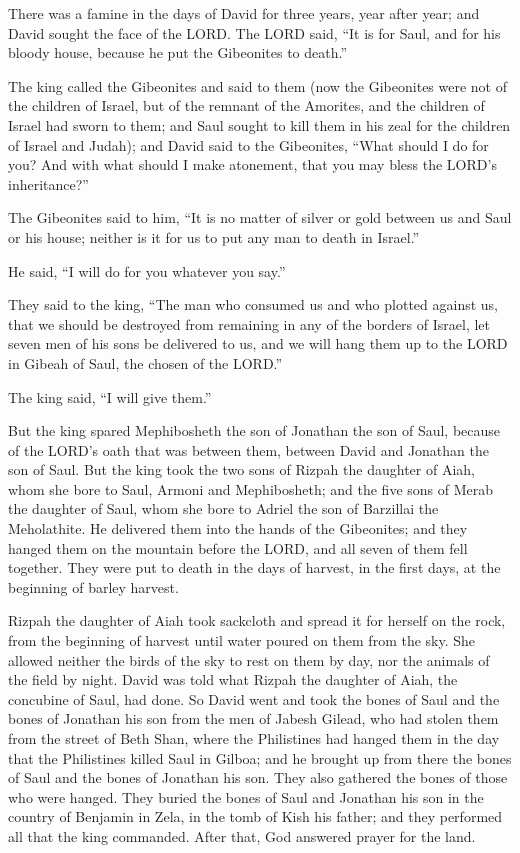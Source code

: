 \mychapter{} \myverse*{}There was a famine in the days of David for three years, year
after year; and David sought the face of the LORD. The LORD said, “It is for Saul, and for his bloody
house, because he put the Gibeonites to death.”

\myverse{}The king called the Gibeonites and said to them (now the Gibeonites
were not of the children of Israel, but of the remnant of the Amorites, and the children of Israel had
sworn to them; and Saul sought to kill them in his zeal for the children of Israel and Judah);
\myverse{}and David said to the Gibeonites, “What should I do for you? And with what
should I make atonement, that you may bless the LORD’s inheritance?”

\myverse{}The Gibeonites said to him, “It is no matter of silver or gold
between us and Saul or his house; neither is it for us to put any man to death in Israel.”

He said, “I will do for you whatever you say.”

\myverse{}They said to the king, “The man who consumed us and who plotted
against us, that we should be destroyed from remaining in any of the borders of Israel,
\myverse{}let seven men of his sons be delivered to us, and we will hang them up to the
LORD in Gibeah of Saul, the chosen of the LORD.”

The king said, “I will give them.”

\myverse{}But the king spared Mephibosheth the son of Jonathan the son of
Saul, because of the LORD’s oath that was between them, between David and Jonathan the son of Saul.
\myverse{}But the king took the two sons of Rizpah the daughter of Aiah, whom she bore
to Saul, Armoni and Mephibosheth; and the five sons of Merab the daughter of Saul, whom she bore to Adriel
the son of Barzillai the Meholathite.
\myverse{}He delivered them into the hands of the Gibeonites; and they hanged them on
the mountain before the LORD, and all seven of them fell together. They were put to death in the days
of harvest, in the first days, at the beginning of barley harvest.

\myverse{}Rizpah the daughter of Aiah took sackcloth and spread it for
herself on the rock, from the beginning of harvest until water poured on them from the sky. She allowed
neither the birds of the sky to rest on them by day, nor the animals of the field by night.
\myverse{}David was told what Rizpah the daughter of Aiah, the concubine of Saul, had
done.
\myverse{}So David went and took the bones of Saul and the bones of Jonathan his son
from the men of Jabesh Gilead, who had stolen them from the street of Beth Shan, where the Philistines
had hanged them in the day that the Philistines killed Saul in Gilboa;
\myverse{}and he brought up from there the bones of Saul and the bones of Jonathan
his son. They also gathered the bones of those who were hanged.
\myverse{}They buried the bones of Saul and Jonathan his son in the country of Benjamin
in Zela, in the tomb of Kish his father; and they performed all that the king commanded. After that, God
answered prayer for the land.

